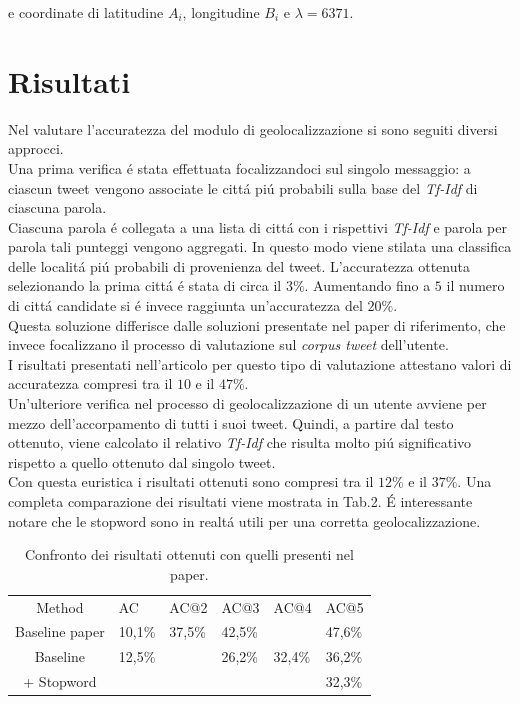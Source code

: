 \documentclass[twocolumn,10pt]{asme2ej}
\begin{document}
e coordinate di latitudine $A_i$, longitudine $B_i$ e $\lambda=6371$. 

\section{Risultati}

Nel valutare l'accuratezza del modulo di geolocalizzazione si sono seguiti diversi approcci. \\Una prima verifica \'e stata effettuata focalizzandoci sul singolo messaggio: a ciascun tweet vengono associate le citt\'a pi\'u probabili sulla base del \textit{Tf-Idf} di ciascuna parola.\\ Ciascuna parola \'e collegata a una lista di citt\'a con i rispettivi \textit{Tf-Idf} e parola per parola tali punteggi vengono aggregati. In questo modo viene stilata una classifica delle localit\'a pi\'u probabili di provenienza del tweet. L'accuratezza ottenuta selezionando la prima citt\'a \'e stata di circa il $3\%$. Aumentando fino a $5$ il numero di citt\'a candidate si \'e invece raggiunta un'accuratezza del $20\%$. \\ Questa soluzione differisce dalle soluzioni presentate nel paper di riferimento, che invece focalizzano il processo di valutazione sul \textit{corpus tweet} dell'utente. \\I risultati presentati nell'articolo per questo tipo di valutazione attestano   
valori di accuratezza compresi tra il $10$ e il $47\%$.  \\Un'ulteriore verifica nel processo di geolocalizzazione di un utente avviene per mezzo dell'accorpamento di tutti i suoi tweet. Quindi, a partire dal testo ottenuto, viene calcolato il relativo \textit{Tf-Idf} che risulta molto pi\'u significativo rispetto a quello ottenuto dal singolo tweet. \\Con questa euristica i risultati ottenuti sono compresi tra il $12\%$ e il $37\%$. Una completa comparazione dei risultati viene mostrata in Tab.2. \'E interessante notare che le stopword sono in realt\'a utili per una corretta geolocalizzazione.


\begin{table}[h]
\caption{Confronto dei risultati ottenuti con quelli presenti nel paper.}
\begin{center}
\label{table_ASME}
\begin{tabular}{c l l l l l}
& & \\ %
\hline
Method & AC &  AC@2 &  AC@3 & AC@4 &  AC@5 \\
\hline
Baseline paper &  10,1\% &  37,5\% &  42,5\% & & 47,6\% \\
Baseline  &  12,5\% &    &  26,2\% & 32,4\% & 36,2\% \\
+ Stopword &   &    &  &  & 32,3\% \\

\hline
\end{tabular}
\end{center}
\end{table}
\end{document}
